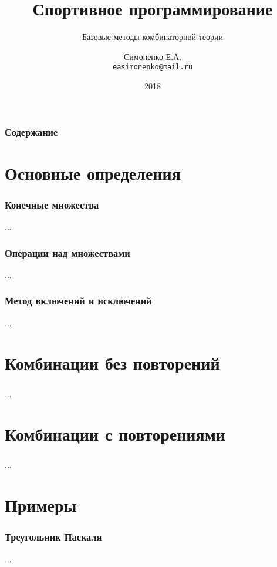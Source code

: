\documentclass[11pt]{beamer}
\begin{document}
\author{Симоненко Е.А. \\ \texttt{easimonenko@mail.ru}}
\title{Спортивное программирование}
\subtitle{Базовые методы комбинаторной теории}
\date{2018}

\begin{frame}
\titlepage
\end{frame}

\begin{frame}
\frametitle{Содержание}
\tableofcontents
\end{frame}

\section{Основные определения}

\begin{frame}[fragile]
\frametitle{Конечные множества}
...
\end{frame}

\begin{frame}[fragile]
\frametitle{Операции над множествами}
...
\end{frame}

\begin{frame}[fragile]
\frametitle{Метод включений и исключений}
...
\end{frame}

\section{Комбинации без повторений}

\begin{frame}[fragile]
\frametitle{}
...
\end{frame}

\section{Комбинации с повторениями}

\begin{frame}[fragile]
\frametitle{}
...
\end{frame}

\section{Примеры}

\begin{frame}[fragile]
\frametitle{Треугольник Паскаля}
...
\end{frame}
\end{document}
